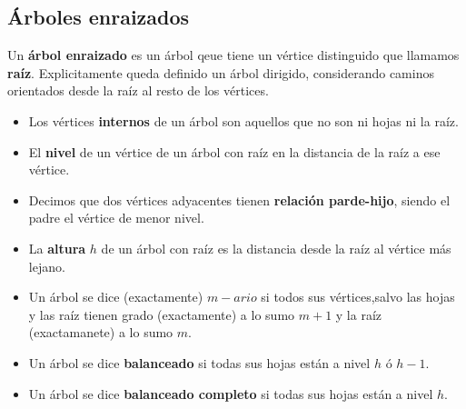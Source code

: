 \subsection{Árboles enraizados}
Un \textbf{árbol enraizado} es un árbol qeue tiene un vértice distinguido que llamamos \textbf{raíz}. Explicitamente queda definido un árbol dirigido, considerando caminos orientados desde la raíz al resto de los vértices.

\begin{itemize}
	\item Los vértices \textbf{internos} de un árbol son aquellos que no son ni hojas ni la raíz.
	\item El \textbf{nivel} de un vértice de un árbol con raíz en la distancia de la raíz a ese vértice.
	\item Decimos que dos vértices adyacentes tienen \textbf{relación parde-hijo}, siendo el padre el vértice de menor nivel.
	\item La \textbf{altura} \(h\) de un árbol con raíz es la distancia desde la raíz al vértice más lejano.
	\item Un árbol se dice (exactamente) \(m-ario\) si todos sus vértices,salvo las hojas y las raíz tienen grado (exactamente) a lo sumo \(m + 1\) y la raíz (exactamanete) a lo sumo \(m\).
	\item Un árbol se dice \textbf{balanceado} si todas sus hojas están a nivel \(h\) ó \(h - 1\).
	\item Un árbol se dice \textbf{balanceado completo} si todas sus hojas están a nivel \(h\).
\end{itemize}

